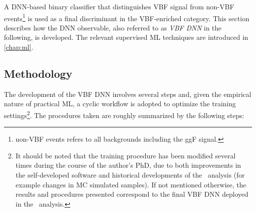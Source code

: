 A DNN-based binary classifier that distinguishes VBF signal from non-VBF events\footnote{non-VBF events refers to all backgrounds including the ggF signal.} is used as a final discriminant in the VBF-enriched \TwoJet category.
This section describes how the DNN observable, also referred to as \emph{VBF DNN} in the following, is developed.
The relevant supervised ML techniques are introduced in \cref{chap:ml}.

\subsection{Methodology}
The development of the VBF DNN involves several steps and, given the empirical nature of practical ML, a cyclic workflow is adopted to optimize the training settings\footnote{It should be noted that the training procedure has been modified several times during the course of the author's PhD, due to both improvements in the self-developed software and historical developments of the \HWW\ analysis (for example changes in MC simulated samples). If not mentioned otherwise, the results and procedures presented correspond to the final VBF DNN deployed in the \HWW\ analysis.}.
The procedures taken are roughly summarized by the following steps:

